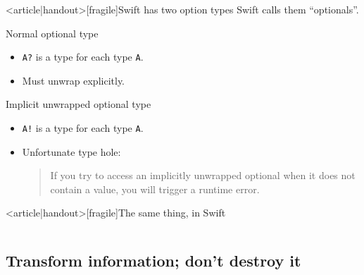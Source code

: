 \begin{frame}<article|handout>[fragile]{Swift has two option types}
  Swift calls them ``optionals''.

  \begin{block}{Normal optional type}
    \begin{itemize}
    \item \texttt{A?} is a type for each type \texttt{A}.
    \item Must unwrap explicitly.
    \end{itemize}
  \end{block}

  \begin{block}{Implicit unwrapped optional type}
    \begin{itemize}
    \item \texttt{A!} is a type for each type \texttt{A}.
    \item Unfortunate type hole:
      \begin{quote}
        If you try to access an implicitly unwrapped optional when it
        does not contain a value, you will trigger a runtime error.
      \end{quote}
    \end{itemize}
  \end{block}
\end{frame}

\begin{frame}<article|handout>[fragile]{The same thing, in Swift}
  \inputminted{ocaml}{FizzBuzz8.swift}
\end{frame}

\subsection{Transform information; don't destroy it}

